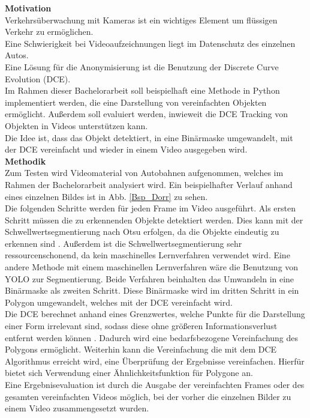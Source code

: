 \documentclass[a4paper,11pt,pdftex, parskip]{scrreprt}
\begin{document}
{\bfseries \large Motivation\\}
Verkehrsüberwachung mit Kameras ist ein wichtiges Element um flüssigen Verkehr zu ermöglichen. \\
Eine Schwierigkeit bei Videoaufzeichnungen liegt im Datenschutz des einzelnen Autos.  \\
Eine Lösung für die Anonymisierung ist die Benutzung der Discrete Curve Evolution (DCE).\\
Im Rahmen dieser Bachelorarbeit soll beispielhaft eine Methode in Python implementiert werden, die eine Darstellung von vereinfachten Objekten ermöglicht. Außerdem soll evaluiert werden, inwieweit die DCE Tracking von Objekten in Videos unterstützen kann. \\
Die Idee ist, dass das Objekt detektiert, in eine Binärmaske umgewandelt, mit der DCE vereinfacht und wieder in einem Video ausgegeben wird.\\%
{\bfseries \large Methodik\\}
Zum Testen wird Videomaterial von Autobahnen aufgenommen, welches im Rahmen der Bachelorarbeit analysiert wird. Ein beispielhafter Verlauf anhand eines einzelnen Bildes ist in Abb. \ref{Bsp_Dorr} zu sehen. \\
Die folgenden Schritte werden für jeden Frame im Video ausgeführt. 
Als ersten Schritt müssen die zu erkennenden Objekte detektiert werden. Dies kann mit der Schwellwertsegmentierung nach Otsu erfolgen, da die Objekte eindeutig zu erkennen sind \citep{Otsu1979}. Außerdem ist die Schwellwertsegmentierung sehr ressourcenschonend, da kein maschinelles Lernverfahren verwendet wird. Eine andere Methode mit einem maschinellen Lernverfahren wäre die Benutzung von YOLO zur Segmentierung. Beide Verfahren beinhalten das Umwandeln in eine Binärmaske als zweiten Schritt. Diese Binärmaske wird im dritten Schritt in ein Polygon umgewandelt, welches mit der DCE vereinfacht wird. \\
Die DCE berechnet anhand eines Grenzwertes, welche Punkte für die Darstellung einer Form irrelevant sind, sodass diese ohne größeren Informationsverlust entfernt werden können \citep{Barkowsky2000}. Dadurch wird eine bedarfsbezogene Vereinfachung des Polygons ermöglicht. 
Weiterhin kann die Vereinfachung die mit dem DCE Algorithmus erreicht wird, eine Überprüfung der Ergebnisse vereinfachen. Hierfür bietet sich Verwendung einer Ähnlichkeitsfunktion für Polygone an. \\
Eine Ergebnisevaluation ist durch die Ausgabe der vereinfachten Frames  oder des gesamten vereinfachten Videos möglich, bei der vorher die einzelnen Bilder zu einem Video zusammengesetzt wurden. \\
\end{document}
